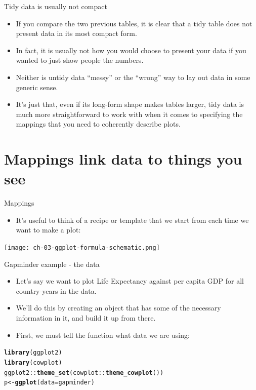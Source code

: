 \documentclass[10pt,handout]{beamer}\usepackage[]{graphicx}\usepackage[]{color}
\makeatletter
\newcommand{\hlopt}[1]{\textcolor[rgb]{0,0,0}{#1}}%
\newcommand{\hlstd}[1]{\textcolor[rgb]{0.345,0.345,0.345}{#1}}%
\newcommand{\hlkwb}[1]{\textcolor[rgb]{0.69,0.353,0.396}{#1}}%
\newcommand{\hlkwc}[1]{\textcolor[rgb]{0.333,0.667,0.333}{#1}}%
\newcommand{\hlkwd}[1]{\textcolor[rgb]{0.737,0.353,0.396}{\textbf{#1}}}%
\newenvironment{kframe}{%
 \def\at@end@of@kframe{}%
 \ifinner\ifhmode%
  \def\at@end@of@kframe{\end{minipage}}%
  \begin{minipage}{\columnwidth}%
 \fi\fi%
 \def\FrameCommand##1{\hskip\@totalleftmargin \hskip-\fboxsep
 \colorbox{shadecolor}{##1}\hskip-\fboxsep
     \hskip-\linewidth \hskip-\@totalleftmargin \hskip\columnwidth}%
 \MakeFramed {\advance\hsize-\width
   \@totalleftmargin\z@ \linewidth\hsize
   \@setminipage}}%
 {\par\unskip\endMakeFramed%
 \at@end@of@kframe}
\newenvironment{knitrout}{}{} %
\makeatother
\begin{document}
\begin{frame}{Tidy data is usually not compact}
	\begin{itemize}
		\item If you compare the two previous tables, it is clear that a tidy table does not present data in its most compact form. \item In fact, it is usually not how you would choose to present your data if you wanted to just show people the numbers. \item Neither is untidy data “messy” or the “wrong” way to lay out data in some generic sense. 
		\item It's just that, even if its long-form shape makes tables larger, tidy data is much more straightforward to work with when it comes to specifying the mappings that you need to coherently describe plots.
	\end{itemize}
\end{frame}


\section{Mappings link data to things you see}

\begin{frame}{Mappings}
	\begin{itemize}
		\item It’s useful to think of a recipe or template that we start from each time we want to make a plot:
	\end{itemize}
\vspace*{0.5in}
\centering
\texttt{[image: ch-03-ggplot-formula-schematic.png]}
\end{frame}



\begin{frame}[fragile]{Gapminder example - the data}
	
	\begin{itemize}
		\item Let’s say we want to plot Life Expectancy against per capita GDP for all country-years in the data. 
		\item  We’ll do this by creating an object that has some of the necessary information in it, and build it up from there. \item First, we must tell the  function what data we are using:
	\end{itemize}
	
\begin{knitrout}
\color{fgcolor}\begin{kframe}
\begin{alltt}
\hlkwd{library}\hlstd{(ggplot2)}
\hlkwd{library}\hlstd{(cowplot)}
\hlstd{ggplot2}\hlopt{::}\hlkwd{theme_set}\hlstd{(cowplot}\hlopt{::}\hlkwd{theme_cowplot}\hlstd{())}
\hlstd{p} \hlkwb{<-} \hlkwd{ggplot}\hlstd{(}\hlkwc{data} \hlstd{= gapminder)}
\end{alltt}
\end{kframe}
\end{knitrout}
	
\end{frame}
\end{document}
